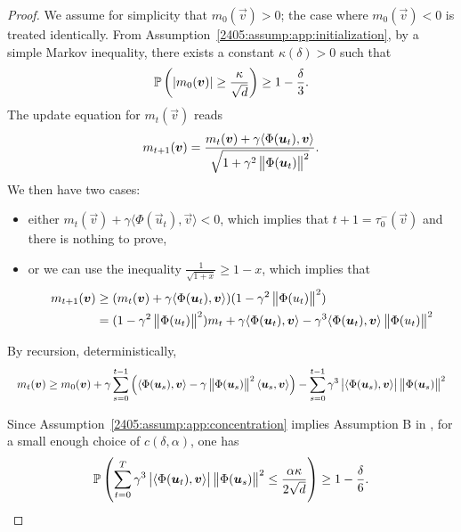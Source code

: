 \begin{proof}
  We assume for simplicity that $m_0(\vec{v}) > 0$; the case where $m_0(\vec{v}) < 0$ is treated identically. From Assumption~\ref{2405:assump:app:initialization}, by a simple Markov inequality, there exists a constant $\kappa(\delta) > 0$ such that
  \begin{equation} \label{2405:eq:app:large_init_event}
    \mathbb{P}\left(|m_0({\boldsymbol{v}})| \geq \frac{\kappa}{\sqrt{d}}\right) \geq 1 - \frac{\delta}3.
  \end{equation}
  The update equation for $m_t(\vec{v})$  reads
  \[ m_{t+1}({\boldsymbol{v}}) = \frac{m_t({\boldsymbol{v}}) + \gamma \langle \Phi({\boldsymbol{u}}_t), {\boldsymbol{v}} \rangle}{\sqrt{1 + \gamma^2  \left\lVert \Phi({\boldsymbol{u}}_t)\right\rVert^2}}. \]
  We then have two cases:
  \begin{itemize}
    \item either $m_t(\vec{v}) + \gamma \langle \Phi(\vec{u}_t), \vec{v} \rangle < 0$, which implies that $t+1 = \tau_0^-(\vec{v})$ and there is nothing to prove,
    \item or we can use the inequality $\frac1{\sqrt{1+x}} \geq 1 - x$, which implies that
      \begin{align*}
        m_{t+1}({\boldsymbol{v}}) &\geq (m_t({\boldsymbol{v}}) + \gamma \langle \Phi({\boldsymbol{u}}_t), {\boldsymbol{v}} \rangle)(1 - \gamma^2  \left\lVert \Phi(u_t)\right\rVert^2) \\
        &= (1 - \gamma^2  \left\lVert \Phi(u_t)\right\rVert^2)m_t + \gamma \langle \Phi({\boldsymbol{u}}_t), {\boldsymbol{v}} \rangle - \gamma^3 \langle \Phi({\boldsymbol{u}}_t), {\boldsymbol{v}} \rangle  \left\lVert \Phi(u_t)\right\rVert^2
      \end{align*}
  \end{itemize}
  By recursion, deterministically,
  \[
    \resizebox{\linewidth}{!}{$\displaystyle
      m_t(\vec{v}) \geq m_0(\vec{v}) + \gamma\sum_{s = 0}^{t-1} \left(\langle \Phi(\vec{u}_s), \vec{v} \rangle - \gamma\norm{\Phi(\vec{u}_s)}^2\langle \vec{u}_s, \vec{v} \rangle\right) - \sum_{s=0}^{t-1}\gamma^3 \left|\langle \Phi(\vec{u}_s), \vec{v} \rangle\right|\norm{\Phi(\vec{u}_s)}^2
    $}
  \]

  Since Assumption~\ref{2405:assump:app:concentration} implies Assumption B in \cite{arous2021online}, for a small enough choice of $c(\delta, \alpha)$, one has
  \[ \mathbb{P}\left( \sum_{t=0}^T\gamma^3 \left|\langle \Phi({\boldsymbol{u}}_t), {\boldsymbol{v}} \rangle\right| \left\lVert \Phi({\boldsymbol{u}}_s)\right\rVert^2 \leq \frac{\alpha\kappa}{2\sqrt{d}} \right) \geq 1 - \frac\delta6. \]


\end{proof}
